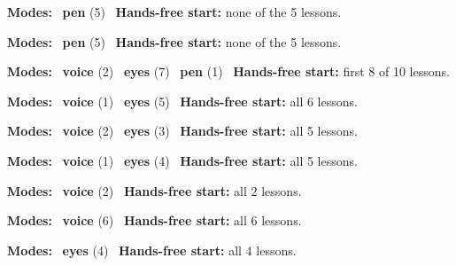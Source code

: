 \expandafter\def\csname hlchaptermodality6\endcsname{%
  {\small\noindent
    \textbf{Modes:} \hlpensign{}~\textbf{pen} (5)\quad
    \hlvoicesign{}~\textbf{Hands-free start:} none of the 5 lessons.%
    \par}\medskip
}

\expandafter\def\csname hlchaptermodality7\endcsname{%
  {\small\noindent
    \textbf{Modes:} \hlpensign{}~\textbf{pen} (5)\quad
    \hlvoicesign{}~\textbf{Hands-free start:} none of the 5 lessons.%
    \par}\medskip
}

\expandafter\def\csname hlchaptermodality8\endcsname{%
  {\small\noindent
    \textbf{Modes:} \hlvoicesign{}~\textbf{voice} (2) \quad \hlsightsign{}~\textbf{eyes} (7) \quad \hlpensign{}~\textbf{pen} (1)\quad
    \hlvoicesign{}~\textbf{Hands-free start:} first 8 of 10 lessons.%
    \par}\medskip
}

\expandafter\def\csname hlchaptermodality9\endcsname{%
  {\small\noindent
    \textbf{Modes:} \hlvoicesign{}~\textbf{voice} (1) \quad \hlsightsign{}~\textbf{eyes} (5)\quad
    \hlvoicesign{}~\textbf{Hands-free start:} all 6 lessons.%
    \par}\medskip
}

\expandafter\def\csname hlchaptermodality10\endcsname{%
  {\small\noindent
    \textbf{Modes:} \hlvoicesign{}~\textbf{voice} (2) \quad \hlsightsign{}~\textbf{eyes} (3)\quad
    \hlvoicesign{}~\textbf{Hands-free start:} all 5 lessons.%
    \par}\medskip
}

\expandafter\def\csname hlchaptermodality11\endcsname{%
  {\small\noindent
    \textbf{Modes:} \hlvoicesign{}~\textbf{voice} (1) \quad \hlsightsign{}~\textbf{eyes} (4)\quad
    \hlvoicesign{}~\textbf{Hands-free start:} all 5 lessons.%
    \par}\medskip
}

\expandafter\def\csname hlchaptermodality12\endcsname{%
  {\small\noindent
    \textbf{Modes:} \hlvoicesign{}~\textbf{voice} (2)\quad
    \hlvoicesign{}~\textbf{Hands-free start:} all 2 lessons.%
    \par}\medskip
}

\expandafter\def\csname hlchaptermodality13\endcsname{%
  {\small\noindent
    \textbf{Modes:} \hlvoicesign{}~\textbf{voice} (6)\quad
    \hlvoicesign{}~\textbf{Hands-free start:} all 6 lessons.%
    \par}\medskip
}

\expandafter\def\csname hlchaptermodality14\endcsname{%
  {\small\noindent
    \textbf{Modes:} \hlsightsign{}~\textbf{eyes} (4)\quad
    \hlvoicesign{}~\textbf{Hands-free start:} all 4 lessons.%
    \par}\medskip
}

